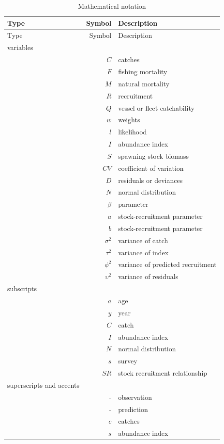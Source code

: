 \documentclass[
]{book}
\begin{document}
\begin{longtable}[]{@{}lrl@{}}
\caption{\label{tab:mathsnotation} Mathematical notation}\tabularnewline
\toprule\noalign{}
Type & Symbol & Description \\
\midrule\noalign{}
\endfirsthead
\toprule\noalign{}
Type & Symbol & Description \\
\midrule\noalign{}
\endhead
\bottomrule\noalign{}
\endlastfoot
variables & & \\
& \(C\) & catches \\
& \(F\) & fishing mortality \\
& \(M\) & natural mortality \\
& \(R\) & recruitment \\
& \(Q\) & vessel or fleet catchability \\
& \(w\) & weights \\
& \(l\) & likelihood \\
& \(I\) & abundance index \\
& \(S\) & spawning stock biomass \\
& \(CV\) & coefficient of variation \\
& \(D\) & residuals or deviances \\
& \(N\) & normal distribution \\
& \(\beta\) & parameter \\
& \(a\) & stock-recruitment parameter \\
& \(b\) & stock-recruitment parameter \\
& \(\sigma^2\) & variance of catch \\
& \(\tau^2\) & variance of index \\
& \(\phi^2\) & variance of predicted recruitment \\
& \(\upsilon^2\) & variance of residuals \\
subscripts & & \\
& \(a\) & age \\
& \(y\) & year \\
& \(C\) & catch \\
& \(I\) & abundance index \\
& \(N\) & normal distribution \\
& \(s\) & survey \\
& \(SR\) & stock recruitment relationship \\
superscripts and accents & & \\
& \(\hat{}\) & observation \\
& \(\tilde{}\) & prediction \\
& \(c\) & catches \\
& \(s\) & abundance index \\
\end{longtable}
\end{document}
